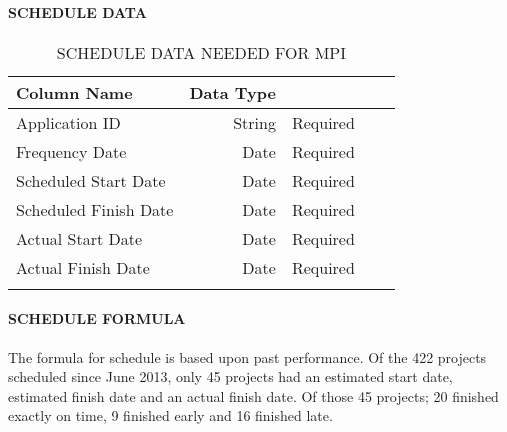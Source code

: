 \documentclass[SDSUThesis.tex]{subfiles}
\begin{document}
            \paragraph{SCHEDULE DATA}
            
                \begin{longtable}{@{}l rr rr}
                    \toprule%
                     \centering%
                     {\bfseries Column Name}
                     & {\bfseries Data Type}
                     &  \\
                    
                    \cmidrule[0.4pt](r{0.125em}){1-1}%
                    \cmidrule[0.4pt](lr{0.125em}){2-2}%
                    \cmidrule[0.4pt](l{0.125em}){3-3}%
                    \endhead
                    
                    Application ID & String  & Required \\
                    \myrowcolour%
                    Frequency Date & Date & Required \\
                    Scheduled Start Date & Date & Required \\
                    \myrowcolour%
                    Scheduled Finish Date & Date & Required \\
                    Actual Start Date & Date  & Required \\
                    \myrowcolour%
                    Actual Finish Date & Date  & Required \\
                    
                    \bottomrule
                    
                    \caption{SCHEDULE DATA NEEDED FOR MPI}
                    \label{tab:sched}
                \end{longtable}
                    
            \paragraph{SCHEDULE FORMULA}
    
                The formula for schedule is based upon past performance.  Of the 422 projects
                scheduled since June 2013, only 45 projects had an estimated start date, estimated
                finish date and an actual finish date.  Of those 45 projects; 20 finished exactly on time,
                9 finished early and 16 finished late.  
                
\end{document}
